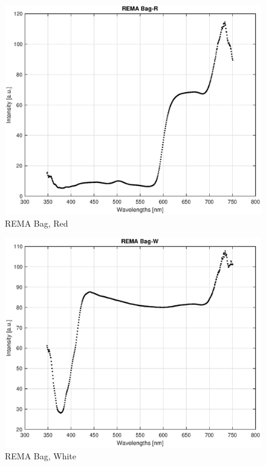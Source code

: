 \begin{appendices}
\begin{figure}
    \centering
    \includegraphics[width = 12cm]{Images/appendix/remared.eps}
    \caption{REMA Bag, Red}
    \label{fig:remared}
\end{figure}

\begin{figure}
    \centering
    \includegraphics[width = 12cm]{Images/appendix/remawhite.eps}
    \caption{REMA Bag, White}
    \label{fig:remawhite}
\end{figure}


\end{appendices}
